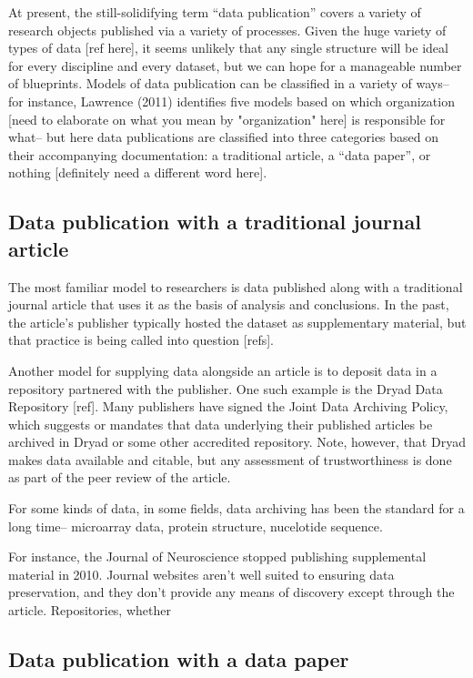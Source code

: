 \documentclass{article}
\begin{document}
At present, the still-solidifying term ``data publication'' covers a variety of research objects published via a variety of processes.
Given the huge variety of types of data [ref here], it seems unlikely that any single structure will be ideal for every discipline and every dataset, but we can hope for a manageable number of blueprints. Models of data publication can be classified in a variety of ways-- for instance, Lawrence (2011) identifies five models based on which organization [need to elaborate on what you mean by "organization" here] is responsible for what-- but here data publications are classified into three categories based on their accompanying documentation: a traditional article, a ``data paper'', or nothing [definitely need a different word here].

\subsection{Data publication with a traditional journal article}\label{data-publication-with-a-traditional-journal-article}

The most familiar model to researchers is data published along with a traditional journal article that uses it as the basis of analysis and conclusions. In the past, the article's publisher typically hosted the dataset as supplementary material, but that practice is being called into question [refs]. 

Another model for supplying data alongside an article is to deposit data in a repository partnered with the publisher. One such example is the Dryad Data Repository [ref]. Many publishers have signed the Joint Data Archiving Policy, which suggests or mandates that data underlying their published articles be archived in Dryad or some other accredited repository. Note, however, that Dryad makes data available and citable, but any assessment of trustworthiness is done as part of the peer review of the article. 

For some kinds of data, in some fields, data archiving has been the standard for a long time-- microarray data, protein structure, nucelotide sequence.

For instance, the Journal of Neuroscience stopped publishing supplemental material in 2010. 
Journal websites aren't well suited to ensuring data preservation, and they don't provide any means of discovery except through the article. Repositories, whether

\subsection{Data publication with a data paper}\label{data-publication-with-a-data-paper}
\end{document}
